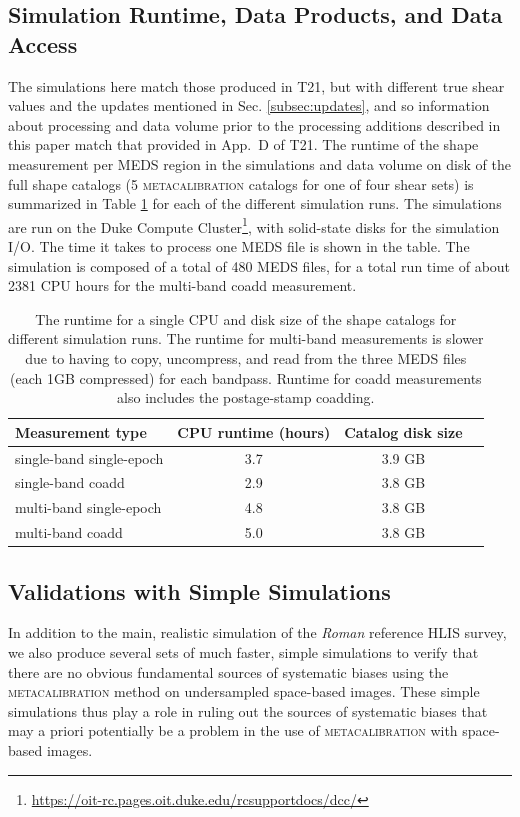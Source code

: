 \documentclass[fleqn,usenatbib]{mnras}
\begin{document}
\subsection{Simulation Runtime, Data Products, and Data Access}
The simulations here match those produced in T21, but with different true shear values and the updates mentioned in Sec. \ref{subsec:updates}, and so information about processing and data volume prior to the processing additions described in this paper match that provided in App.~D of T21.
The runtime of the shape measurement per MEDS region in the simulations and data volume on disk of the full shape catalogs (5 \textsc{metacalibration} catalogs for one of four shear sets) is summarized in Table \ref{tab:data} for each of the different simulation runs. The simulations are run on the Duke Compute Cluster\footnote{\url{https://oit-rc.pages.oit.duke.edu/rcsupportdocs/dcc/}}, with solid-state disks for the simulation I/O. The time it takes to process one MEDS file is shown in the table. The simulation is composed of a total of 480 MEDS files, for a total run time of about 2381 CPU hours for the multi-band coadd measurement.

\begin{table}
    \centering
    \begin{tabular}[width=\columnwidth]{l|c|c|c}
    \hline
    Measurement type &  CPU runtime (hours) & Catalog disk size  \\
    \hline 
    single-band single-epoch  & 3.7 & 3.9 GB \\
    single-band coadd  & 2.9 & 3.8 GB \\
    multi-band single-epoch  & 4.8 & 3.8 GB \\
    multi-band coadd  & 5.0 & 3.8 GB \\
    \hline
    \end{tabular}
    \caption{The runtime for a single CPU and disk size of the shape catalogs for different simulation runs. The runtime for multi-band measurements is slower due to having to copy, uncompress, and read from the three MEDS files (each 1GB compressed) for each bandpass. Runtime for coadd measurements also includes the postage-stamp coadding.}
    \label{tab:data}
\end{table}

\subsection{Validations with Simple Simulations}
\label{subsec:simplesim}
In addition to the main, realistic simulation of the \emph{Roman} reference HLIS survey, we also produce several sets of much faster, simple simulations  to verify that there are no obvious fundamental sources of systematic biases using the \textsc{metacalibration} method on undersampled space-based images. These simple simulations thus play a role in ruling out the sources of systematic biases that may a priori  potentially be a problem in the use of \textsc{metacalibration} with space-based images. 
\end{document}
